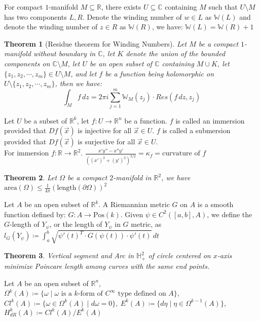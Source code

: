 \documentclass[9pt]{article}
\theoremstyle{break}
\theoremstyle{break}
\newtheorem{thm}{Theorem}[section]
\newcommand{\R}{\mathbb{R}}
\newcommand{\Complex}{\mathbb{C}}
\begin{document}
For compact $1$-manifold $M\subseteq \R$, there exists $U\subseteq \Complex$ containing $M$ such that $U \setminus M$ has two components $L,R$. Denote the winding number of $w \in L$ as $\mathbb{W}(L)$ and denote the winding number of $z \in R$ as $\mathbb{W}(R)$, we have: $\mathbb{W}(L) = \mathbb{W}(R)+1$


\begin{thm}[Residue theorem for Winding Numbers]
Let $M$ be a compact $1$-manifold without boundary in $\Complex$, let $K$ denote the union of the bounded components on $\Complex \setminus M$, let $U$ be an open subset of $\Complex$ containing $M\cup K$, let $\{z_1,z_2,\cdots, z_m\} \in U\setminus M$, and let $f$ be a function being holomorphic on $U \setminus \{z_1,z_2,\cdots, z_m\}$,  then we have:
$$\int_M f\, dz = 2\pi i \sum_{j=1}^m \mathbb{W}_M(z_j) \cdot Res(f\, dz, z_j)$$
\end{thm}
 

Let $U$ be a subset of $\R^k$, let $f:U \to \R^n$ be a function. $f$ is called an immersion provided that $Df(\vec{x})$ is injective for all $\vec{x}\in U$. $f$ is called a submersion provided that $Df(\vec{x})$ is surjective for all $\vec{x}\in U$.  \\For immersion $f:\R \to \R^2$. $\frac{x'y'' - x''y'}{((x')^2 + (y')^2)^{3/2}} = \kappa_f =\text{curvature of }f $

\begin{thm}
Let $\Omega$ be a compact $2$-manifold in $\R^2$, we have $\text{area}(\Omega) \leq \frac{1}{4\pi}\left( \text{length}(\partial \Omega)\right)^2$
\end{thm}


Let $A$ be an open subset of $\R^k$. A Riemannian metric $G$ on $A$ is a smooth function defined by: $G:A \to \text{Pos}(k)$. Given $\psi\in C^2([a,b],A)$, we define the $G$-length of $Y_\psi$, or the length of $Y_{\psi}$ in $G$ metric, as $l_G(Y_{\psi}) \coloneqq \int_a^b \sqrt{\psi'(t)^T \cdot G(\psi(t))\cdot \psi'(t)}\, dt$


\begin{thm}
Vertical segment and Arc in $\mathbb{H}_+^2$ of circle centered on $x$-axis minimize Poincare length among curves with the same end points.
\end{thm}

Let $A$ be an open subset of $\R^n$, $\Omega^k(A) \coloneqq \{\omega \mid \omega\text{ is a }k\text{-form of }C^\infty \text{ type defined on }A\}$,\\ 
$Cl^k(A) \coloneqq \{\omega \in \Omega^k(A) \mid d\omega = 0 \},\
E^k(A) \coloneqq \{ d\eta \mid \eta \in \Omega^{k-1}(A) \}$, $H^k_{dR}(A)\coloneqq Cl^k(A)/ E^k(A)$
\end{document}
